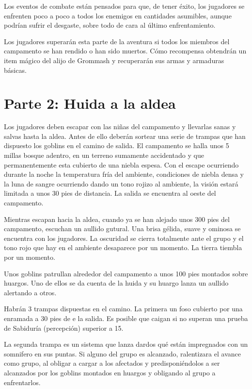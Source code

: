 \documentclass[10pt,twoside,twocolumn,openany]{dndbook}
\begin{document}
Los eventos de combate están pensados para que, de tener éxito, los jugadores se enfrenten poco a poco 
a todos los enemigos en cantidades asumibles, aunque podrían sufrir el desgaste, sobre todo de cara al 
último enfrentamiento.

Los jugadores superarán esta parte de la aventura si todos los miembros del campamento se han rendido 
o han sido muertos. Cómo recompensa obtendrán un item mágico del alijo de Grommash y recuperarán sus 
armas y armaduras básicas.


\section{Parte 2: Huida a la aldea}

Los jugadores deben escapar con las niñas del campamento y llevarlas sanas y salvas hasta la aldea. 
Antes de ello deberán sortear una serie de trampas que han dispuesto los goblins en el camino de salida. 
El campamento se halla unos 5 millas bosque adentro, en un terreno sumamente accidentado y que 
permanentemente esta cubierto de una niebla espesa. Con el escape ocurriendo durante la noche 
la temperatura fría del ambiente, condiciones de niebla densa y la luna de sangre ocurriendo dando 
un tono rojizo al ambiente, la visión estará limitada a unos 30 pies de distancia. La salida se 
encuentra al oeste del campamento.

\begin{DndReadAloud}
Mientras escapan hacia la aldea, cuando ya se han alejado unos 300 pies del campamento, escuchan 
un aullido gutural. Una brisa gélida, suave y ominosa se encuentra con los jugadores. La oscuridad
se cierra totalmente ante el grupo y el tono rojo que hay en el ambiente desaparece por un momento.
La tierra tiembla por un momento.
\end{DndReadAloud}

Unos goblins patrullan alrededor del campamento a unos 100 pies montados sobre huargos. Uno de ellos
se da cuenta de la huida y su huargo lanza un aullido alertando a otros.

Habrán 3 trampas dispuestas en el camino. La primera un foso cubierto por una enramada a 30 pies de e
la salida. Es posible que caigan si no superan una prueba de Sabiduría (percepción) superior a 15.

La segunda trampa es un sistema que lanza dardos qué están impregnados con un somnifero en sus puntas. 
Si alguno del grupo es alcanzado, ralentizara el avance como grupo, al obligar a cargar a los afectados 
y predisponiéndolos a ser alcanzados por los goblins montados en huargos y obligando al grupo a 
enfrentarlos.
\end{document}
